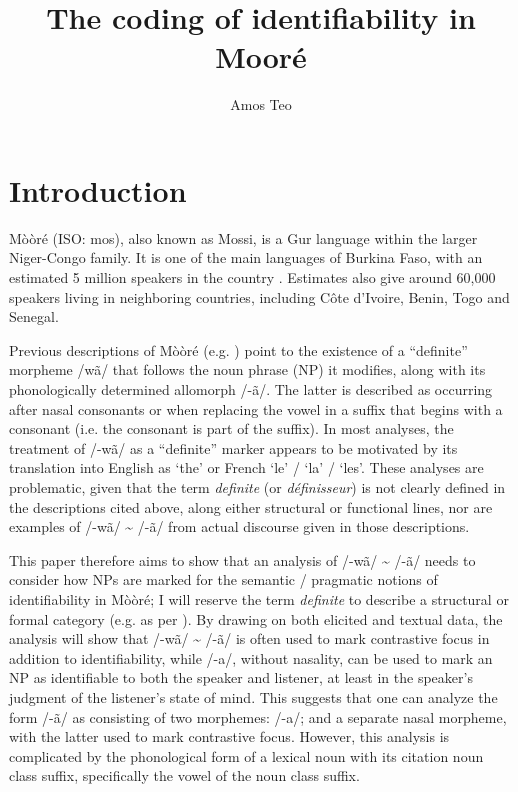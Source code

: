 \documentclass[output=paper]{langsci/langscibook}
\title{The coding of identifiability in Mooré}
\author{Amos Teo \affiliation{University of Oregon}
}
\begin{document}


\section{Introduction}\label{sec:teo:1}

M\`{o}\`{o}r\'{e} (ISO: mos), also known as Mossi, is a Gur language within the larger Niger-Congo family. It is one of the main languages of Burkina Faso, with an estimated 5 million speakers in the country \citep{Lews2013}. Estimates also give around 60,000 speakers living in neighboring countries, including Côte d’Ivoire, Benin, Togo and Senegal.

Previous descriptions of Mòòré (e.g. \citealt{Peterson1971, Canu1973/1976, Nikiema1989}) point to the existence of a “definite” morpheme /wã/ that follows the noun phrase (NP) it modifies, along with its phonologically determined allomorph /-ã/. The latter is described as occurring after nasal consonants or when replacing the vowel in a suffix that begins with a consonant (i.e. the consonant is part of the suffix). In most analyses, the treatment of /-wã/ as a “definite” marker appears to be motivated by its translation into English as ‘the’ or French ‘le’ / ‘la’ / ‘les’. These analyses are problematic, given that the term \textit{definite} (or \textit{d\'{e}finisseur}) is not clearly defined in the descriptions cited above, along either structural or functional lines, nor are examples of /-w\~{a}/ \~{} /-\~{a}/ from actual discourse given in those descriptions.

This paper therefore aims to show that an analysis of /-wã/ \~{} /-\~{a}/ needs to consider how NPs are marked for the semantic / pragmatic notions of identifiability in Mòòré; I will reserve the term \textit{definite} to describe a structural or formal category (e.g. as per \citealt{DuBois1980}). By drawing on both elicited and textual data, the analysis will show that /-wã/ \~{} /-\~{a}/ is often used to mark contrastive focus in addition to identifiability, while /-a/, without nasality, can be used to mark an NP as identifiable to both the speaker and listener, at least in the speaker’s judgment of the listener’s state of mind. This suggests that one can analyze the form /-\~{a}/ as consisting of two morphemes: /-a/; and a separate nasal morpheme, with the latter used to mark contrastive focus. However, this analysis is complicated by the phonological form of a lexical noun with its citation noun class suffix, specifically the vowel of the noun class suffix.
\end{document}
